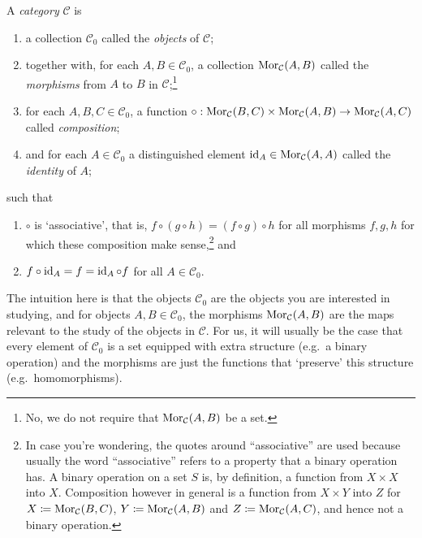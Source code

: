 \begin{dfn}[Category]
A \emph{category} $\mathcal{C}$ is
\begin{enumerate}
\item a collection $\mathcal{C}_0$ called the \emph{objects} of $\mathcal{C}$;
\item together with, for each $A,B\in \mathcal{C}_0$, a collection $\operatorname{Mor} _{\mathcal{C}}(A,B)$ called the \emph{morphisms} from $A$ to $B$ in $\mathcal{C}$;\footnote{No, we do not require that $\operatorname{Mor} _{\mathcal{C}}(A,B)$ be a set.}
\item for each $A,B,C\in \mathcal{C}_0$, a function $\circ :\operatorname{Mor} _{\mathcal{C}}(B,C)\times \operatorname{Mor} _{\mathcal{C}}(A,B)\rightarrow \operatorname{Mor} _{\mathcal{C}}(A,C)$ called \emph{composition};
\item and for each $A\in \mathcal{C}_0$ a distinguished element $\operatorname{id} _{A}\in \operatorname{Mor} _{\mathcal{C}}(A,A)$ called the \emph{identity} of $A$;
\end{enumerate}
such that
\begin{enumerate}
\item $\circ$ is `associative', that is, $f\circ (g\circ h)=(f\circ g)\circ h$ for all morphisms $f,g,h$ for which these composition make sense,\footnote{In case you're wondering, the quotes around ``associative'' are used because usually the word ``associative'' refers to a property that a binary operation has.  A binary operation on a set $S$ is, by definition, a function from $X\times X$ into $X$.  Composition however in general is a function from $X\times Y$ into $Z$ for $X\coloneqq \operatorname{Mor} _{\mathcal{C}}(B,C)$, $Y\coloneqq \operatorname{Mor} _{\mathcal{C}}(A,B)$ and $Z\coloneqq \operatorname{Mor} _{\mathcal{C}}(A,C)$, and hence not a binary operation.} and
\item $f\circ \operatorname{id} _A=f=\operatorname{id} _A\circ f$ for all $A\in \mathcal{C}_0$.
\end{enumerate}
\end{dfn}
The intuition here is that the objects $\mathcal{C}_0$ are the objects you are interested in studying, and for objects $A,B\in \mathcal{C}_0$, the morphisms $\operatorname{Mor} _{\mathcal{C}}(A,B)$ are the maps relevant to the study of the objects in $\mathcal{C}$.  For us, it will usually be the case that every element of $\mathcal{C}_0$ is a set equipped with extra structure (e.g.~a binary operation) and the morphisms are just the functions that `preserve' this structure (e.g.~homomorphisms).

